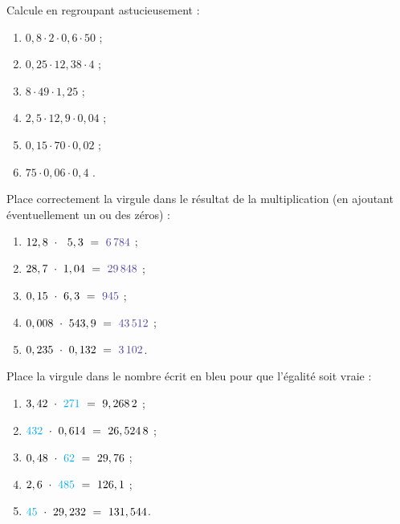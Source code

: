 \begin{exercice}
Calcule en regroupant astucieusement :
\begin{enumerate} 
 \item $0,8 \cdot 2 \cdot 0,6 \cdot 50$ \dotfill ; \hspace*{8em}
 
 \item $0,25 \cdot 12,38 \cdot 4$ \dotfill ; \hspace*{8em}
 
 \item $8 \cdot 49 \cdot 1,25$ \dotfill ; \hspace*{8em}
 
 \item $2,5 \cdot 12,9 \cdot 0,04$ \dotfill ; \hspace*{8em}
 
 \item $0,15 \cdot 70 \cdot 0,02$ \dotfill ; \hspace*{8em}
 
 \item $75 \cdot 0,06 \cdot 0,4$ \dotfill. \hspace*{8em}
 
 \end{enumerate} 
\end{exercice}


\begin{exercice}
Place correctement la virgule dans le résultat de la multiplication (en ajoutant éventuellement un ou des zéros) :
\begin{enumerate} 
 \item $12,8 \cdot  5,3 = \textcolor{PartieGeometrie}{6\,784}$ ;
 \item $28,7 \cdot 1,04 = \textcolor{PartieGeometrie}{29\,848}$ ;
 \item $0,15 \cdot 6,3 = \textcolor{PartieGeometrie}{945}$ ;
 \item $0,008 \cdot 543,9 = \textcolor{PartieGeometrie}{43\,512}$ ;
 \item $0,235 \cdot 0,132 = \textcolor{PartieGeometrie}{3\,102}$.
 \end{enumerate}
\end{exercice}


\begin{exercice}
Place la virgule dans le nombre écrit en \textcolor{BleuOuv}{bleu} pour que l'égalité soit vraie :
\begin{enumerate} 
 \item $3,42 \cdot \textcolor{BleuOuv}{271} = 9,268\,2$ ;
 \item $\textcolor{BleuOuv}{432} \cdot 0,614 = 26,524\,8$ ;
 \item $0,48 \cdot \textcolor{BleuOuv}{62} = 29,76$ ;
 \item $2,6 \cdot \textcolor{BleuOuv}{485} = 126,1$ ;
 \item $\textcolor{BleuOuv}{45} \cdot 29,232 = 131,544$.
 \end{enumerate}
\end{exercice}


